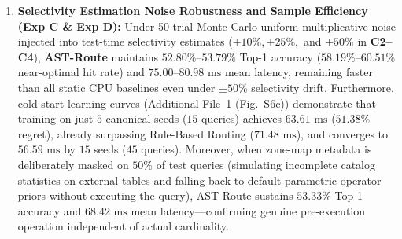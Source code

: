 \documentclass[10pt,a4paper]{article}
\begin{document}
\begin{enumerate}[leftmargin=1.5em,itemsep=0.8pt]
    \item \textbf{Selectivity Estimation Noise Robustness and Sample Efficiency (Exp C \& Exp D):} Under 50-trial Monte Carlo uniform multiplicative noise injected into test-time selectivity estimates ($\pm 10\%, \pm 25\%,$ and $\pm 50\%$ in \textbf{C2--C4}), \textbf{AST-Route} maintains $52.80\%\text{--}53.79\%$ Top-1 accuracy ($58.19\%\text{--}60.51\%$ near-optimal hit rate) and $75.00\text{--}80.98\text{ ms}$ mean latency, remaining faster than all static CPU baselines even under $\pm 50\%$ selectivity drift. Furthermore, cold-start learning curves (Additional File~1 (Fig.~S6c)) demonstrate that training on just $5$ canonical seeds ($15$ queries) achieves $63.61\text{ ms}$ ($51.38\%$ regret), already surpassing Rule-Based Routing ($71.48\text{ ms}$), and converges to $56.59\text{ ms}$ by $15$ seeds ($45$ queries). Moreover, when zone-map metadata is deliberately masked on $50\%$ of test queries (simulating incomplete catalog statistics on external tables and falling back to default parametric operator priors without executing the query), AST-Route sustains $53.33\%$ Top-1 accuracy and $68.42\text{ ms}$ mean latency---confirming genuine pre-execution operation independent of actual cardinality.

\end{enumerate}
\end{document}
